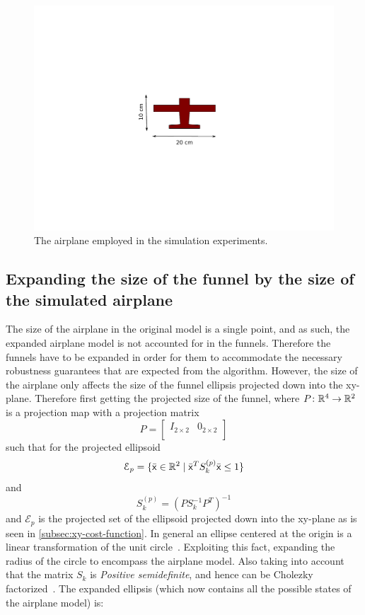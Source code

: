 \begin{figure}
  \centering
  \includegraphics[width=\textwidth, clip={3cm 3cm 3cm 3cm}]{figures/experiments/radio-vehicle-model}
  \caption{The airplane employed in the simulation experiments.}
  \label{fig:radio-vehicle}
\end{figure}

\subsection{Expanding the size of the funnel by the size of the simulated
  airplane}
\label{subsec:expand-funnel}

The size of the airplane in the original model is a single point, and as such,
the expanded airplane model is not accounted for in the funnels. Therefore the
funnels have to be expanded in order for them to accommodate the necessary
robustness guarantees that are expected from the algorithm. However, the size of
the airplane only affects the size of the funnel ellipsis projected down into
the xy-plane. Therefore first getting the projected size of the funnel, where
\(P \colon \mathbb{R}^4 \rightarrow \mathbb{R}^2\) is a projection map with a projection matrix
\[
  P =
  \begin{bmatrix}
    I_{2 \times 2} & {0}_{2 \times 2} \\
  \end{bmatrix}
\]
such that for the projected ellipsoid
\[
  \mathcal{E}_{p} = \lbrace\bar{{\mathbf{\mathsf{x}}}} \in \mathbb{R}^{2} \mid
    {\bar{{\mathbf{\mathsf{x}}}}}^{T}S_{k}^{(p)}\bar{{\mathbf{\mathsf{x}}}} \leq 1\rbrace
\]
and
\[
  S_{k}^{(p)} = {\left( PS_{k}^{-1}P^T \right)}^{-1}
\]
and \(\mathcal{E}_{p}\) is the projected set of the ellipsoid projected down
into the xy-plane as is seen in \cref{subsec:xy-cost-function}. In general an
ellipse centered at the origin is a linear transformation of the unit
circle~\cite{lay2005linear}. Exploiting this fact, expanding the radius of the
circle to encompass the airplane model. Also taking into account that the matrix
\(S_{k}\) is \textit{Positive semidefinite}, and hence can be Cholezky
factorized~\cite{lay2005linear}. The expanded ellipsis (which now contains all
the possible states of the airplane model) is:

